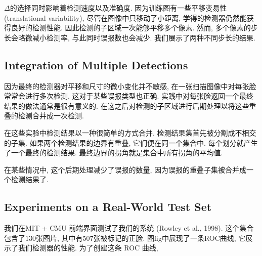 \documentclass[utf8]{ctexart}
\begin{document}
$\Delta$的选择同时影响着检测速度以及准确度. 因为训练图有一些平移变易性 (translational variability), 尽管在图像中只移动了小距离, 学得的检测器仍然能获得良好的检测性能. 因此检测的子区域一次能够平移多个像素.
然而, 多个像素的步长会略微减小检测率, 与此同时误报数也会减少. 我们展示了两种不同步长的结果.

\subsection{Integration of Multiple Detections}
因为最终的检测器对平移和尺寸的微小变化并不敏感, 在一张扫描图像中对每张脸常常会进行多次检测. 这对于某些误报类型也正确. 实践中对每张脸返回一个最终结果的做法通常是很有意义的. 在这之后对检测的子区域进行后期处理以将这些重叠的检测合并成一次检测.

在这些实验中检测结果以一种很简单的方式合并. 检测结果集首先被分割成不相交的子集. 如果两个检测结果的边界有重叠, 它们便在同一个集合中. 每个划分就产生了一个最终的检测结果. 最终边界的拐角就是集合中所有拐角的平均值.

在某些情况中, 这个后期处理减少了误报的数量, 因为误报的重叠子集被合并成一个检测结果了.
\subsection{Experiments on a Real-World Test Set}
我们在MIT + CMU 前端界面测试了我们的系统 (Rowley et al., 1998). 这个集合包含了$130$张图片, 其中有$507$张被标记的正脸. 图fig中展现了一条ROC曲线, 它展示了我们检测器的性能. 为了创建这条 ROC 曲线, 
\end{document}
